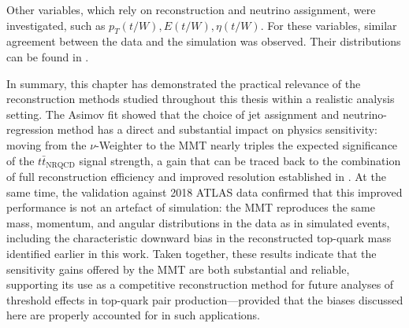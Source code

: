 Other variables, which rely on reconstruction and neutrino assignment, were investigated, such as $p_T(t/W), E(t/W), \eta(t/W)$. For these variables, similar agreement between the data and the simulation was observed. Their distributions can be found in .

In summary, this chapter has demonstrated the practical relevance of the reconstruction methods studied throughout this thesis within a realistic analysis setting. The Asimov fit showed that the choice of jet assignment and neutrino-regression method has a direct and substantial impact on physics sensitivity: moving from the $\nu$-Weighter to the MMT nearly triples the expected significance of the ${t\bar{t}}_{\text{NRQCD}}$ signal strength, a gain that can be traced back to the combination of full reconstruction efficiency and improved resolution established in . At the same time, the validation against 2018 ATLAS data confirmed that this improved performance is not an artefact of simulation: the MMT reproduces the same mass, momentum, and angular distributions in the data as in simulated events, including the characteristic downward bias in the reconstructed top-quark mass identified earlier in this work. Taken together, these results indicate that the sensitivity gains offered by the MMT are both substantial and reliable, supporting its use as a competitive reconstruction method for future analyses of threshold effects in top-quark pair production—provided that the biases discussed here are properly accounted for in such applications.
